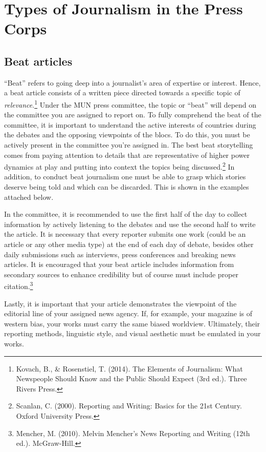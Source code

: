 \section{Types of Journalism in the Press Corps}

\subsection{Beat articles}

“Beat” refers to going deep into a journalist's area of expertise or interest. Hence, a beat article consists of a written piece directed towards a specific topic of \emph{relevance}.\footnote{Kovach, B., \& Rosenstiel, T. (2014). The Elements of Journalism: What Newspeople Should Know and the Public Should Expect (3rd ed.). Three Rivers Press.} Under the MUN press committee, the topic or “beat” will depend on the committee you are assigned to report on. To fully comprehend the beat of the committee, it is important to understand the active interests of countries during the debates and the opposing viewpoints of the blocs. To do this, you must be actively present in the committee you’re assigned in. The best beat storytelling comes from paying attention to details that are representative of higher power dynamics at play and putting into context the topics being discussed.\footnote{Scanlan, C. (2000). Reporting and Writing: Basics for the 21st Century. Oxford University Press.} In addition, to conduct beat journalism one must be able to grasp which stories deserve being told and which can be discarded. This is shown in the examples attached below.

In the committee, it is recommended to use the first half of the day to collect information by actively listening to the debates and use the second half to write the article. It is necessary that every reporter submits one work (could be an article or any other media type) at the end of each day of debate, besides other daily submissions such as interviews, press conferences and breaking news articles. It is encouraged that your beat article includes information from secondary sources to enhance credibility but of course must include proper citation.\footnote{Mencher, M. (2010). Melvin Mencher's News Reporting and Writing (12th ed.). McGraw-Hill.}

Lastly, it is important that your article demonstrates the viewpoint of the editorial line of your assigned news agency. If, for example, your magazine is of western bias, your works must carry the same biased worldview. Ultimately, their reporting methods, linguistic style, and visual aesthetic must be emulated in your works.

